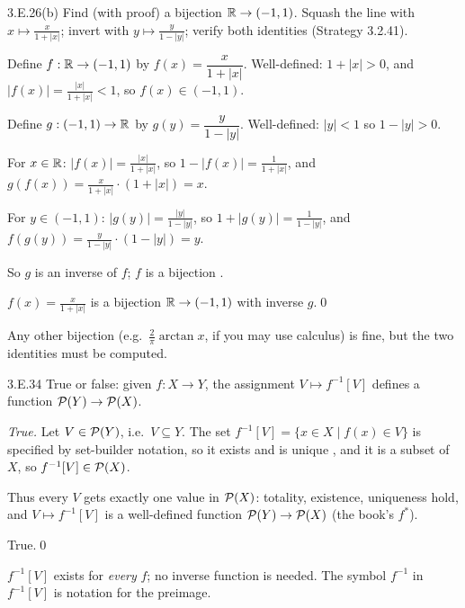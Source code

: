 \begin{bookex}{3.E.26(b)}
Find (with proof) a bijection $\mathbb{R}\to(-1,1)$.
\solution
\plan Squash the line with $x\mapsto\frac x{1+|x|}$; invert with $y\mapsto\frac y{1-|y|}$; verify both identities (Strategy 3.2.41).
\begin{steps}
\item Define $f:\mathbb{R}\to(-1,1)$ by $f(x)=\dfrac x{1+|x|}$. Well-defined: $1+|x|>0$, and $|f(x)|=\frac{|x|}{1+|x|}<1$, so $f(x)\in(-1,1)$.
\item Define $g:(-1,1)\to\mathbb{R}$ by $g(y)=\dfrac y{1-|y|}$. Well-defined: $|y|<1$ so $1-|y|>0$.
\item For $x\in\mathbb{R}$: $|f(x)|=\frac{|x|}{1+|x|}$, so $1-|f(x)|=\frac1{1+|x|}$, and $g(f(x))=\frac{x}{1+|x|}\cdot(1+|x|)=x$.
\item For $y\in(-1,1)$: $|g(y)|=\frac{|y|}{1-|y|}$, so $1+|g(y)|=\frac1{1-|y|}$, and $f(g(y))=\frac y{1-|y|}\cdot(1-|y|)=y$.
\item So $g$ is an inverse of $f$; $f$ is a bijection .
\end{steps}
\conclusion $f(x)=\frac x{1+|x|}$ is a bijection $\mathbb{R}\to(-1,1)$ with inverse $g$.\qed
\begin{compare}
\item Any other bijection (e.g.\ $\frac2\pi\arctan x$, if you may use calculus) is fine, but the two identities must be computed.
\end{compare}
\end{bookex}

\begin{bookex}[essential]{3.E.34}
True or false: given $f:X\to Y$, the assignment $V\mapsto f^{-1}[V]$ defines a function $\mathcal{P}(Y)\to\mathcal{P}(X)$.
\solution
\begin{steps}
\item \emph{True.} Let $V\in\mathcal{P}(Y)$, i.e.\ $V\subseteq Y$. The set $f^{-1}[V]=\{x\in X\mid f(x)\in V\}$ is specified by set-builder notation, so it exists and is unique , and it is a subset of $X$, so $f^{-1}[V]\in\mathcal{P}(X)$.
\item Thus every $V$ gets exactly one value in $\mathcal{P}(X)$: totality, existence, uniqueness hold, and $V\mapsto f^{-1}[V]$ is a well-defined function $\mathcal{P}(Y)\to\mathcal{P}(X)$ (the book's $f^*$).
\end{steps}
\conclusion True.\qed
\begin{compare}
\item $f^{-1}[V]$ exists for \emph{every} $f$; no inverse function is needed. The symbol $f^{-1}$ in $f^{-1}[V]$ is notation for the preimage.
\end{compare}
\end{bookex}

